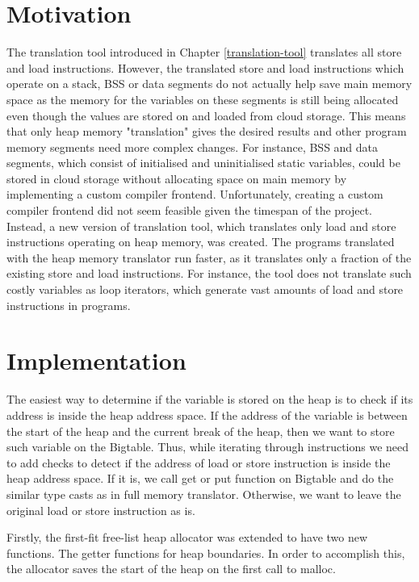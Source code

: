 \documentclass[bsc,frontabs,twoside,singlespacing,parskip,deptreport]{infthesis}     %
\begin{document}
\section{Motivation}

The translation tool introduced in Chapter \ref{translation-tool} translates all store and load instructions. However, the translated store and load instructions which operate on a stack, BSS or data segments do not actually help save main memory space as the memory for the variables on these segments is still being allocated even though the values are stored on and loaded from cloud storage. This means that only heap memory "translation" gives the desired results and other program memory segments need more complex changes. For instance, BSS and data segments, which consist of initialised and uninitialised static variables, could be stored in cloud storage without allocating space on main memory by implementing a custom compiler frontend. Unfortunately, creating a custom compiler frontend did not seem feasible given the timespan of the project. Instead, a new version of translation tool, which translates only load and store instructions operating on heap memory, was created. The programs translated with the heap memory translator run faster, as it translates only a fraction of the existing store and load instructions. For instance, the tool does not translate such costly variables as loop iterators, which generate vast amounts of load and store instructions in programs.

\section{Implementation}

The easiest way to determine if the variable is stored on the heap is to check if its address is inside the heap address space. If the address of the variable is between the start of the heap and the current break of the heap, then we want to store such variable on the Bigtable. Thus, while iterating through instructions we need to add checks to detect if the address of load or store instruction is inside the heap address space. If it is, we call get or put function on Bigtable and do the similar type casts as in full memory translator. Otherwise, we want to leave the original load or store instruction as is. 

Firstly, the first-fit free-list heap allocator was extended to have two new functions. The getter functions for heap boundaries. In order to accomplish this, the allocator saves the start of the heap on the first call to malloc.
\end{document}
